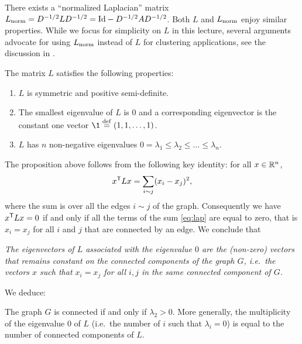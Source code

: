 \documentclass[11pt,nocut]{article}
\begin{document}
\begin{remark}
	There exists a ``normalized Laplacian'' matrix $L_{\rm norm} = D^{-1/2} L D^{-1/2} = {{\rm Id}} - D^{-1/2} A D^{-1/2}$. Both $L$ and $L_{\rm norm}$ enjoy similar properties.
	While we focus for simplicity on $L$ in this lecture, several arguments advocate for using $L_{\rm norm}$ instead of $L$ for clustering applications, see the discussion in \cite[Section~8.4]{von2007tutorial}.
\end{remark}

\begin{proposition}
	The matrix $L$ satisfies the following properties:
	\begin{enumerate}
		\item $L$ is symmetric and positive semi-definite.
		\item The smallest eigenvalue of $L$ is $0$ and a corresponding eigenvector is the constant one vector $\1 \defeq (1,1, \dots, 1)$.
		\item $L$ has $n$ non-negative eigenvalues $0 = \lambda_1 \leq \lambda_2 \leq \dots \leq \lambda_n$.
	\end{enumerate}
\end{proposition}

The proposition above follows from the following key identity: for all $x \in \mathbb{R}^n$,
\begin{equation}\label{eq:lap}
x^{{\sf T}} L x = \sum_{i \sim j} (x_i - x_j)^2,
\end{equation}
where the sum is over all the edges $i \sim j$ of the graph.
Consequently we have $x^{{\sf T}} L x = 0$ if and only if all the terms of the sum \eqref{eq:lap} are equal to zero, that is $x_i = x_j$ for all $i$ and $j$ that are connected by an edge. We conclude that
\begin{center}
	\emph{
	The eigenvectors of $L$ associated with the eigenvalue $0$ are the (non-zero) vectors that remains constant on the connected components of the graph $G$, i.e.\ the vectors $x$ such that $x_i = x_j$ for all $i,j$ in the same connected component of $G$.}
\end{center}

We deduce:
\begin{proposition}\label{prop:lambda2}
	The graph $G$ is connected if and only if $\lambda_2 > 0$.
More generally, the multiplicity of the eigenvalue $0$ of $L$ (i.e.\ the number of $i$ such that $\lambda_i = 0$) is equal to the number of connected components of $L$.
\end{proposition}
\end{document}
